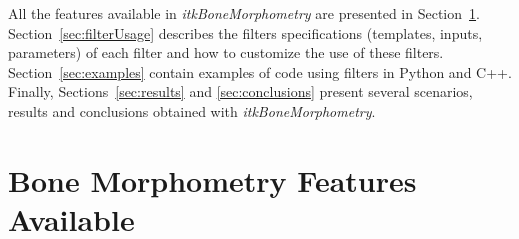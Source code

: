 \documentclass{InsightArticle}
\begin{document}
All the features available in \textit{itkBoneMorphometry} are presented in Section~\ref{sec:features}. Section~\ref{sec:filterUsage} describes the filters specifications (templates, inputs, parameters) of each filter and how to customize the use of these filters. Section~\ref{sec:examples} contain examples of code using  filters in Python and C++. Finally, Sections~\ref{sec:results} and \ref{sec:conclusions} present several scenarios, results and conclusions obtained with \textit{itkBoneMorphometry}.

\newpage

\section{Bone Morphometry Features Available}
\label{sec:features}
\end{document}
